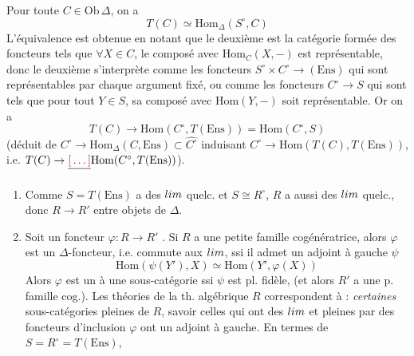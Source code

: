 \documentclass[11pt,a4paper]{article}
\begin{document}
Pour toute $C \in \mathrm{Ob}\,\Delta$, on a
\[
  T(C) \simeq \mathrm{Hom}_{\Delta}(S^{\circ}, C)
\]
L'équivalence est obtenue en notant que le deuxième est la catégorie
formée des foncteurs tels que $\forall X \in C$, le composé avec
$\mathrm{Hom}_{C}(X, -)$ est représentable, donc le deuxième s'interprète
comme les foncteurs $S^{\circ} \times C^{\circ} \to (\mathrm{Ens})$ qui
sont représentables par chaque argument fixé, ou comme les foncteurs
$C^{\circ} \to S$ qui sont tels que pour tout $Y \in S$, sa composé avec
$\mathrm{Hom}(Y, -)$ soit représentable. Or on a
\[
  T(C) \longrightarrow \mathrm{Hom}(C^{\circ}, T(\mathrm{Ens})) =
  \mathrm{Hom}(C^{\circ}, S)
\]
(déduit de $C^{\circ} \to \mathrm{Hom}_{\Delta}(C, \mathrm{Ens}) \subset
\widehat{C^{\circ}}$ induisant $C^{\circ} \to \mathrm{Hom}(T(C),
T(\mathrm{Ens}))$, i.e. $T(C) \to \struck{\ill{}}
\mathrm{Hom}(C^{\circ}, T(\mathrm{Ens}))$).

\begin{enumerate}
  \item[(4)] Comme $S = T(\mathrm{Ens})$ a des $\varprojlim$ quelc. et
    $S \cong R^{\circ}$, $R$ a aussi des $\varinjlim$ quelc., donc
    $R \to R'$  entre objets de
    $\Delta$. 
  \item[(5)] Soit un foncteur $\varphi : R \to R'$ . Si $R$ a une petite famille
    cogénératrice, alors $\varphi$ est un $\Delta$-foncteur, i.e.
    commute aux $\varprojlim$, ssi il admet un adjoint à gauche $\psi$
    \[
      \mathrm{Hom}(\psi(Y'), X) \simeq \mathrm{Hom}(Y', \varphi(X))
    \]
    Alors $\varphi$ est un  à une sous-catégorie
     \ill{} \ill{} ssi
    $\psi$ est pl. fidèle, (et alors $R'$ a une p. famille cog.).
     \struck{\ill{}} Les théories de
    la th. algébrique $R$  correspondent 
    à : \emph{certaines} sous-catégories pleines de $R$, savoir
    celles qui ont des $\varprojlim$ et pleines par des foncteurs
    d'inclusion $\varphi$ ont un adjoint à gauche. En termes de $S =
    R^{\circ} = T(\mathrm{Ens})$,  
\end{enumerate}
\end{document}
